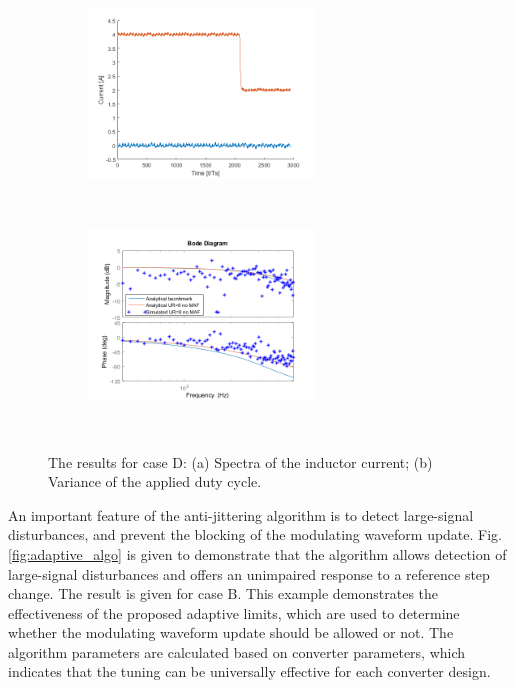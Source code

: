 \documentclass[journal]{IEEEtran}
\begin{document}
\begin{figure}[t!]
\centering
\begin{subfigure}{0.5\textwidth}
  \centering
  \includegraphics[width=0.95\linewidth, height = 45mm]{figures/nas_step.png}
  \caption{}
  \label{fig:N830kHz_sub1}
\end{subfigure}\\
\begin{subfigure}{0.5\textwidth}
  \centering
  \includegraphics[width=0.95\linewidth, height = 45mm]{figures/nasb_clfra.png}
  \caption{}
  \label{fig:N830kHz_sub2}
\end{subfigure}\\
\caption{The results for case D: (a) Spectra of the inductor current; (b) Variance of the applied duty cycle.}
\label{fig:N830kHz}
\end{figure}

\noindent
An important feature of the anti-jittering algorithm is to detect large-signal disturbances, and prevent the blocking of the modulating waveform update. Fig. \ref{fig:adaptive_algo} is given to demonstrate that the algorithm allows detection of large-signal disturbances and offers an unimpaired response to a reference step change. The result is given for case B. This example demonstrates the effectiveness of the proposed adaptive limits, which are used to determine whether the modulating waveform update should be allowed or not. The algorithm parameters are calculated based on converter parameters, which indicates that the tuning can be universally effective for each converter design.
\end{document}
